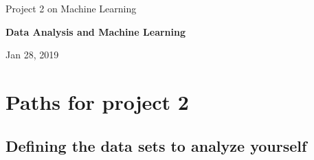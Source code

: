 \documentclass[%
oneside,                 %
final,                   %
10pt]{article}
\begin{document}

\newcommand{\exercisesection}[1]{\subsection*{#1}}






\thispagestyle{empty}

\begin{center}
{\LARGE\bf
\begin{spacing}{1.25}
Project 2 on Machine Learning
\end{spacing}
}
\end{center}


\begin{center}
{\bf Data Analysis and Machine Learning${}^{}$} \\ [0mm]
\end{center}

\begin{center}
\end{center}
    

\begin{center}
Jan 28, 2019
\end{center}

\vspace{1cm}


\section*{Paths for project 2}

\subsection*{Defining the data sets to analyze yourself}
\end{document}
